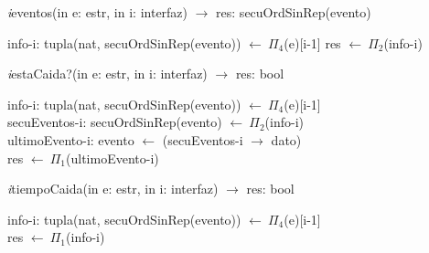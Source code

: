\vspace{11pt}

\textit{i}eventos(in e: estr, in i: interfaz) $\longrightarrow$ res: secuOrdSinRep(evento)\\
\begin{algorithm}[H]
\BlankLine
info-i: tupla(nat, secuOrdSinRep(evento)) $\leftarrow\ \Pi_4$(e)[i-1]
\BlankLine
res $\leftarrow\ \Pi_2$(info-i)
\end{algorithm}

\vspace{11pt}

\textit{i}estaCaida?(in e: estr, in i: interfaz) $\longrightarrow$ res: bool\\
\begin{algorithm}[H]
\BlankLine
info-i: tupla(nat, secuOrdSinRep(evento)) $\leftarrow\ \Pi_4$(e)[i-1]\\
\BlankLine
secuEventos-i: secuOrdSinRep(evento) $\leftarrow\ \Pi_2$(info-i)\\
\BlankLine
ultimoEvento-i: evento $\leftarrow$ (secuEventos-i $\rightarrow$ dato)\\
\BlankLine
res $\leftarrow\ \Pi_1$(ultimoEvento-i)
\end{algorithm}

\vspace{11pt}

\textit{i}tiempoCaida(in e: estr, in i: interfaz) $\longrightarrow$ res: bool\\
\begin{algorithm}[H]
\BlankLine
info-i: tupla(nat, secuOrdSinRep(evento)) $\leftarrow\ \Pi_4$(e)[i-1]\\
\BlankLine
res $\leftarrow\ \Pi_1$(info-i)
\end{algorithm}

\vspace{11pt}

